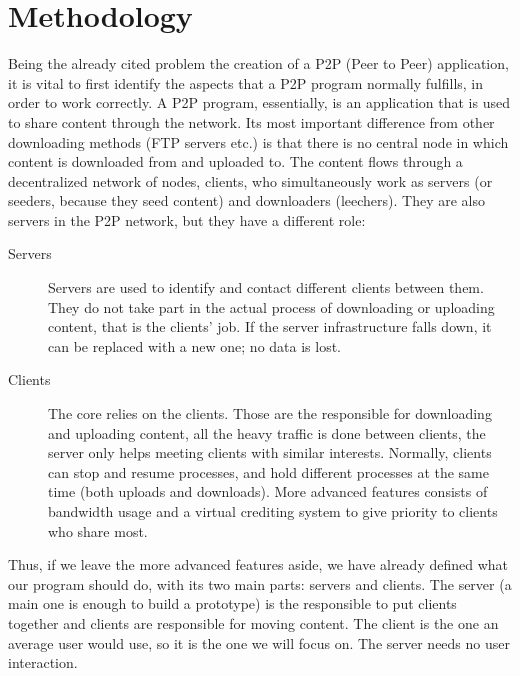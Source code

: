 \section{Methodology}
\label{sec:met}

Being the already cited problem the creation of a P2P (Peer to Peer) application, it is vital to first identify the aspects that a P2P program normally fulfills, in order to work correctly. A P2P program, essentially, is an application that is used to share content through the network. Its most important difference from other downloading methods (FTP servers etc.) is that there is no central node in which content is downloaded from and uploaded to. The content flows through a decentralized network of nodes, clients, who simultaneously work as servers (or seeders, because they seed content) and downloaders (leechers). They are also servers in the P2P network, but they have a different role:
 
\begin{description}
 \item [Servers] Servers are used to identify and contact different clients between them. They do not take part in the actual process of downloading or uploading content, that is the clients' job. If the server infrastructure falls down, it can be replaced with a new one; no data is lost.
 \item [Clients] The core relies on the clients. Those are the responsible for downloading and uploading content, all the heavy traffic is done between clients, the server only helps meeting clients with similar interests. Normally, clients can stop and resume processes, and hold different processes at the same time (both uploads and downloads). More advanced features consists of bandwidth usage and a virtual crediting system to give priority to clients who share most. 
\end{description}

Thus, if we leave the more advanced features aside, we have already defined what our program should do, with its two main parts: servers and clients. The server (a main one is enough to build a prototype) is the responsible to put clients together and clients are responsible for moving content. The client is the one an average user would use, so it is the one we will focus on. The server needs no user interaction.

